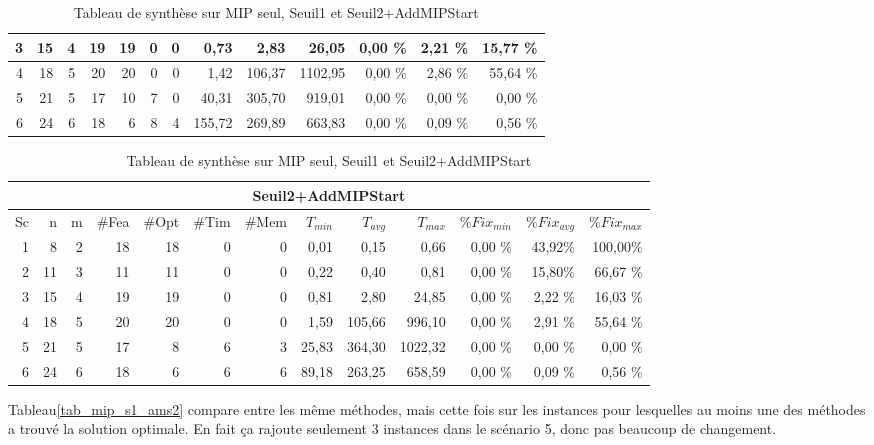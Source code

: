 \documentclass[twoside,fleqn]{EPURapport}
\begin{document}
\begin{table}[h]
\begin{tabular}{|r|r|r|r|r|r|r|r|r|r|r|r|r|}
3&  	15	& 4	& 19	& 19	& 0	& 0	 & 0,73	        &2,83	&26,05	&0,00	\%&2,21	\%&15,77   \%  \\ \hline
4&		18	&5	&	20	&	20	&0	&	0&		1,42	&106,37	&1102,95&0,00	\%&2,86	\%&55,64   \%    \\ \hline
5&		21	&5	&	17	&	10	&7	&	0&		40,31	&305,70	&919,01	&0,00	\%&0,00	\%&0,00    \%     \\ \hline
6&		24	&6	&	18	&	6	&8	&	4&		155,72	&269,89	&663,83	&0,00	\%&0,09	\%&0,56    \%  \\ \hline
    \end{tabular} 
\vspace{1em}
    \begin{tabular}{|r|r|r|r|r|r|r|r|r|r|r|r|r|}
    	\hline
    	\multicolumn{13}{|c|}{Seuil2+AddMIPStart}\\ \hline
    	Sc &	n	&m	&\#Fea	&\#Opt	&\#Tim &\#Mem	&$T_{min}$ & $T_{avg}$	& $T_{max}$ & $\%Fix_{min}$ & $\%Fix_{avg}$	& $\%Fix_{max}$ \\ \hline
1&	8	&2	&18	&18	&0	&0	&0,01	&0,15	    &0,66	 	&0,00	\%&43,92\%&	100,00\%    \\ \hline
2&	11	&3	&11	&11	&0	&0	&0,22	&0,40	    &0,81		&0,00	\%&15,80\%&	66,67 \%     \\ \hline
3&	15	&4	&19	&19	&0	&0	&0,81	&2,80	    &24,85	&0,00	\%&2,22	\%&16,03 \%  \\ \hline
4&	18	&5	&20	&20	&0	&0	&1,59	&105,66	&996,10	&0,00	\%&2,91	\%&55,64 \%    \\ \hline
5&	21	&5	&17	&8	&6	&3	&25,83	&364,30	&1022,32	&0,00	\%&0,00	\%&0,00  \%     \\ \hline
6&	24	&6	&18	&6	&6	&6	&89,18	&263,25	&658,59	&0,00	\%&0,09	\%&0,56  \%  \\ \hline
    \end{tabular}

    \caption{Tableau de synthèse sur MIP seul, Seuil1 et Seuil2+AddMIPStart}
    \label{tab_mip_s1_ams2_opt}
\end{table}
\bigskip

Tableau\ref{tab_mip_s1_ams2} compare entre les même méthodes, mais cette fois sur les instances pour lesquelles au moins une des méthodes a trouvé la solution optimale.
En fait ça rajoute seulement 3 instances dans le scénario 5, donc pas beaucoup de changement.
\end{document}
